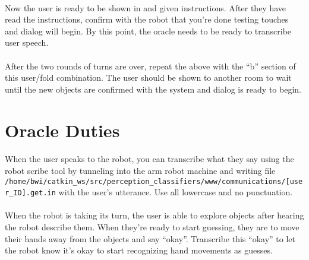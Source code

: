 \documentclass{article}
\begin{document}
\paragraph{} Now the user is ready to be shown in and given instructions. After they have read the instructions, confirm with the robot that you're done testing touches and dialog will begin. By this point, the oracle needs to be ready to transcribe user speech.

\paragraph{} After the two rounds of turns are over, repeat the above with the ``b'' section of this user/fold combination. The user should be shown to another room to wait until the new objects are confirmed with the system and dialog is ready to begin.

\section{Oracle Duties}

\paragraph{} When the user speaks to the robot, you can transcribe what they say using the robot scribe tool by tunneling into the arm robot machine and writing file \texttt{/home/bwi/catkin\_ws/src/perception\_classifiers/www/communications/[user\_ID].get.in} with the user's utterance. Use all lowercase and no punctuation.

\paragraph{} When the robot is taking its turn, the user is able to explore objects after hearing the robot describe them. When they're ready to start guessing, they are to move their hands away from the objects and say ``okay''. Transcribe this ``okay'' to let the robot know it's okay to start recognizing hand movements as guesses.
\end{document}
